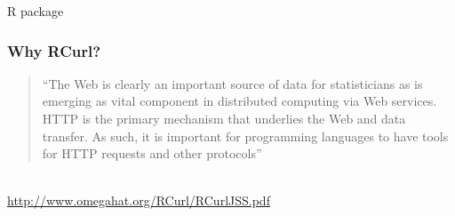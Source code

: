 \documentclass{beamer}\usepackage[]{graphicx}\usepackage[]{color}
\begin{document}

\begin{frame}
 \begin{center}
  \Huge{\textcolor{mandarina}{R package }}
 \end{center}
\end{frame}


\begin{frame}
\frametitle{Why RCurl?}

\begin{quotation}
``The Web is clearly an important source of data for statisticians as is emerging as vital component in distributed computing via Web services. HTTP is the primary mechanism that underlies the Web and data transfer. As such, it is important for programming languages to have tools for HTTP requests and other protocols''
\end{quotation}

{\footnotesize 
\hspace{8mm}  \\
\hspace{8mm} \url{http://www.omegahat.org/RCurl/RCurlJSS.pdf}
}

\end{frame}


{ %
    \begin{frame}[plain]
     \end{frame}
}
\end{document}
